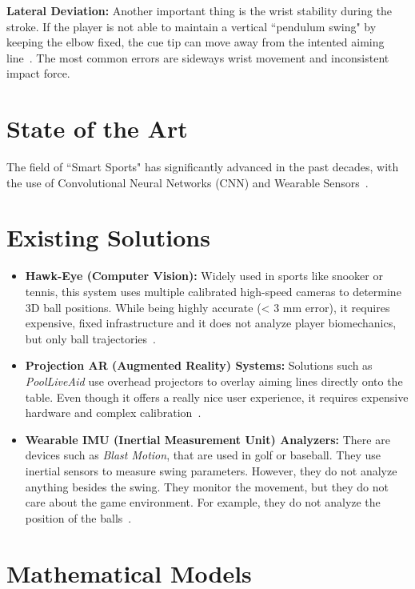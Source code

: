 \textbf{Lateral Deviation:}
Another important thing is the wrist stability during the stroke. If the player is not able to maintain a vertical ``pendulum swing" by keeping the elbow fixed, the cue tip can move away from the intented aiming line~\cite{bib:moore}. The most common errors are sideways wrist movement and inconsistent impact force.

\section{State of the Art}

The field of ``Smart Sports" has significantly advanced in the past decades, with the use of Convolutional Neural Networks (CNN) and Wearable Sensors~\cite{bib:sensors}.

\section{Existing Solutions}
\begin{itemize}
    \item \textbf{Hawk-Eye (Computer Vision):} Widely used in sports like snooker or tennis, this system uses multiple calibrated high-speed cameras to determine 3D ball positions. While being highly accurate (< 3 mm error), it requires expensive, fixed infrastructure and it does not analyze player biomechanics, but only ball trajectories~\cite{bib:hawk-eye}.
    
    \item \textbf{Projection AR (Augmented Reality) Systems:} Solutions such as \textit{PoolLiveAid} use overhead projectors to overlay aiming lines directly onto the table. Even though it offers a really nice user experience, it requires expensive hardware and complex calibration~\cite{bib:pool-live}.
    
    \item \textbf{Wearable IMU (Inertial Measurement Unit) Analyzers:} There are devices such as \textit{Blast Motion}, that are used in golf or baseball. They use inertial sensors to measure swing parameters. However, they do not analyze anything besides the swing. They monitor the movement, but they do not care about the game environment. For example, they do not analyze the position of the balls~\cite{bib:blast}.
\end{itemize}

\section{Mathematical Models}

